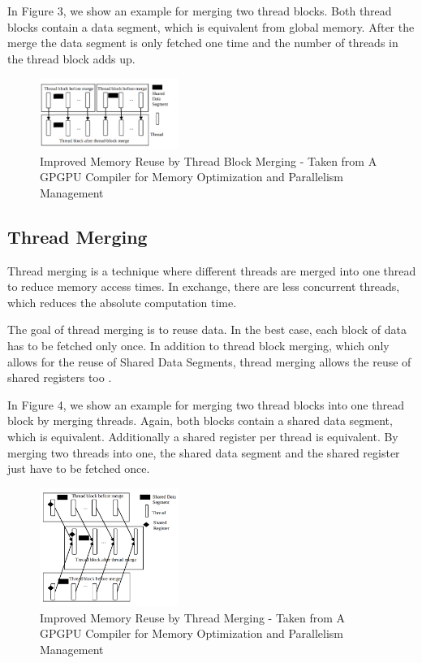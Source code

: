 \documentclass[conference]{IEEEtran}
\begin{document}
	
	In Figure 3, we show an example for merging two thread blocks. Both thread blocks contain a data segment, which is equivalent from global memory. After the merge the data segment is only fetched one time and the number of threads in the thread block adds up.
	
	\begin{figure}[htbp]
		\centerline{\includegraphics[width=0.4\textwidth]{ThreadBlockMerge.png}}
		\caption{Improved Memory Reuse by Thread Block Merging - Taken from A GPGPU Compiler for Memory Optimization and Parallelism Management}
		\label{fig3}
	\end{figure}
	
	\subsection{Thread Merging}
	
	
	Thread merging is a technique where different threads are merged into one thread to reduce memory access times. In exchange, there are less concurrent threads, which reduces the absolute computation time.
	
		

	The goal of thread merging is to reuse data. In the best case, each block of data has to be fetched only once. In addition to thread block merging, which only allows for the reuse of Shared Data Segments, thread merging allows the reuse of shared registers too \cite{GPGPUCompiler}. 
	
	
	In Figure 4, we show an example for merging two thread blocks into one thread block by merging threads. Again, both blocks contain a shared data segment, which is equivalent. Additionally a shared register per thread is equivalent. By merging two threads into one, the shared data segment and the shared register just have to be fetched once.
	
	\begin{figure}[htbp]
		\centerline{\includegraphics[width=0.4\textwidth]{ThreadMerge.png}}
		\caption{Improved Memory Reuse by Thread Merging - Taken from  A GPGPU Compiler for Memory Optimization and Parallelism Management}
		\label{fig2}
	\end{figure}
	
\end{document}
